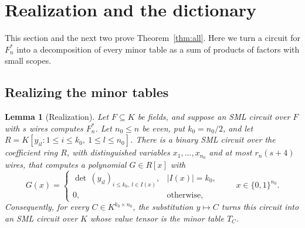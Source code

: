\documentclass[11pt]{article}
\newtheorem{lemma}[theorem]{Lemma}
\theoremstyle{remark}
\begin{document}
\section{Realization and the dictionary}\label{sec:circuit}
This section and the next two prove Theorem~\ref{thm:all}. Here we turn a
circuit for \(F^*_n\) into a decomposition of every minor table as a sum
of products of factors with small scopes.

\subsection{Realizing the minor tables}\label{sec:realize}

\begin{lemma}[Realization]\label{lem:realize}
Let \(F\subseteq K\) be fields, and suppose an SML circuit over \(F\) with
\(s\) wires computes \(F^*_n\). Let \(n_0\le n\) be even, put
\(k_0=n_0/2\), and let \(R=K[y_{il}:1\le i\le k_0,\ 1\le l\le n_0]\).
There is a binary SML circuit over the coefficient ring \(R\), with
distinguished variables \(x_1,\ldots,x_{n_0}\) and at most
\(r_n(s+4)\) wires, that computes a polynomial \(G\in R[x]\) with
\[
 G(x)=\begin{cases}\det\,(y_{il})_{i\le k_0,\ l\in I(x)},&|I(x)|=k_0,\\
 0,&\text{otherwise,}\end{cases}
 \qquad x\in\{0,1\}^{n_0}.
\]
Consequently, for every \(C\in K^{k_0\times n_0}\), the substitution
\(y\mapsto C\) turns this circuit into an SML circuit over \(K\) whose
value tensor is the minor table \(T_C\).
\end{lemma}
\end{document}
